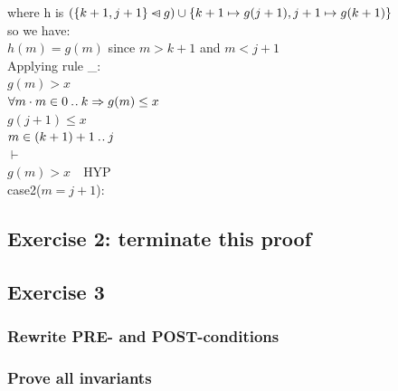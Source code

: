 \documentclass[11pt,a4paper,fleqn]{article}
\begin{document}
\noindent
where h is $ (\{k+1, j+1\} \mathbin{\lhd\mkern-14mu-} g) \cup\{k+1 \mapsto g(j+1), j+1 \mapsto g(k+1)\}$\\
\noindent so we have:\\
$h(m) = g(m)$ since $m>k+1 $ and $m<j+1$\\ 
\noindent Applying rule \_:\\
$g(m)>x $\\
$ \forall m \cdot m \in 0 \mathbin{.\mkern1mu.} k \Rightarrow g(m) \leq x $\\
$g(j+1) \leq x $\\
$m \in (k + 1)+1 \mathbin{.\mkern1mu.} j$\\
$\vdash$\\
$g(m)>x \quad \text{HYP}$\\

\noindent
case2($m = j+1 $):\\



\subsection{Exercise 2: terminate this proof}
\noindent




\subsection{Exercise 3}

\subsubsection{Rewrite PRE- and POST-conditions}


\subsubsection{Prove all invariants}
\end{document}
